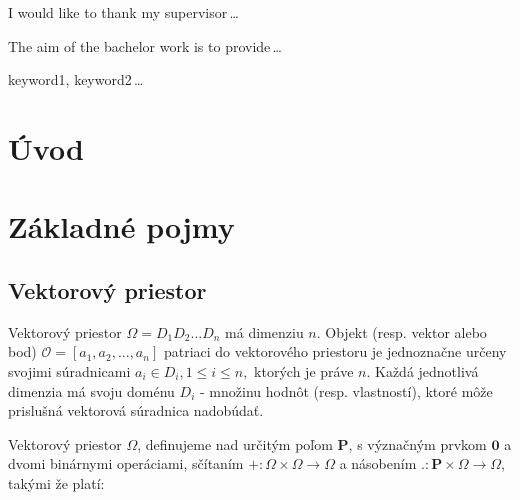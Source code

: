 \documentclass[12pt,oneside]{fithesis2}
\begin{document}
  \FrontMatter                    %
    \ThesisTitlePage                %
    \begin{ThesisDeclaration}       %
      \DeclarationText
      \AdvisorName
    \end{ThesisDeclaration}
    \begin{ThesisThanks}            %
      I would like to thank my supervisor\,\dots
    \end{ThesisThanks}
    \begin{ThesisAbstract}          %
      The aim of the bachelor work is to provide\,\dots
    \end{ThesisAbstract}
    \begin{ThesisKeyWords}          %
      keyword1, keyword2\,\dots
    \end{ThesisKeyWords}
    \tableofcontents                %
  
  \MainMatter                     %
    \chapter{Úvod}          %
    
    \chapter{Základné pojmy}
    
    	\section{Vektorový priestor}
    Vektorový priestor $ \Omega = D_1D_2. . .D_n $ má dimenziu $n$. Objekt (resp. vektor alebo bod)  $\mathcal{O} = [a_1, a_2, . . . , a_n] $ patriaci do vektorového priestoru je jednoznačne určeny svojimi súradnicami $ a_i \in D_i, 1 \le i \le n, $ ktorých je práve $n$. Každá jednotlivá dimenzia má svoju doménu $D_i$ - množinu hodnôt (resp. vlastností), ktoré môže prislušná vektorová súradnica nadobúdať. \cite{stromy}
    	
    Vektorový priestor $\Omega$, definujeme nad určitým poľom $\mathbf{P} $, s význačným prvkom $\mathbf{0}$ a dvomi binárnymi operáciami, sčítaním $+ : \Omega \times \Omega \rightarrow \Omega $  a násobením $. : \mathbf{P}  \times \Omega \rightarrow \Omega$, takými že platí: 
     
\end{document}
